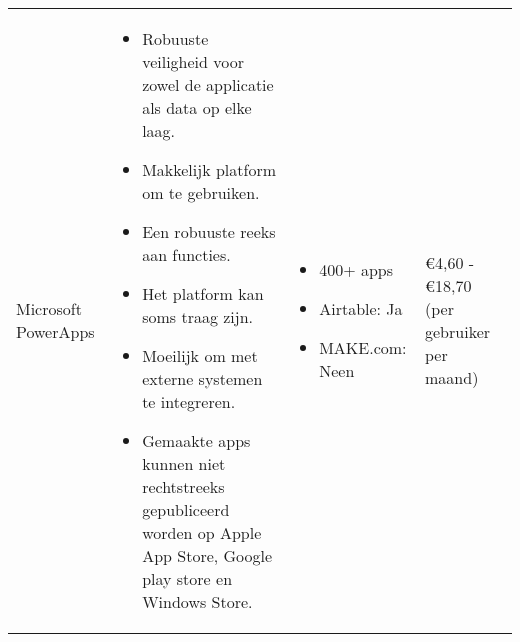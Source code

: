 \begin{longtable}{p{2.5cm} p{5.5cm} p{3.5cm} p{2.5cm}}
    Microsoft PowerApps & 
    \vspace{-\topsep}\vspace{-\partopsep} 
    \begin{itemize}[leftmargin=2pt, topsep=0pt,parsep=0pt,noitemsep]
        \item[] Robuuste veiligheid voor zowel de applicatie als data op elke laag.
        \item[] Makkelijk platform om te gebruiken.
        \item[] Een robuuste reeks aan functies.
    \end{itemize}
    \begin{itemize}[leftmargin=2pt, topsep=8pt,parsep=0pt,noitemsep]
        \item[] Het platform kan soms traag zijn.
        \item[] Moeilijk om met externe systemen te integreren.
        \item[] Gemaakte apps kunnen niet rechtstreeks gepubliceerd worden op Apple App Store, Google play store en Windows Store.
    \end{itemize} &
    \vspace{-\topsep}\vspace{-\partopsep} 
    \begin{itemize}[leftmargin=2pt, topsep=0pt,parsep=0pt,noitemsep]
        \item[]  400+ apps
        \item[]  Airtable: Ja
        \item[]  MAKE.com: Neen
    \end{itemize} &
    €4,60 - €18,70 (per gebruiker per maand)\\



\end{longtable}
